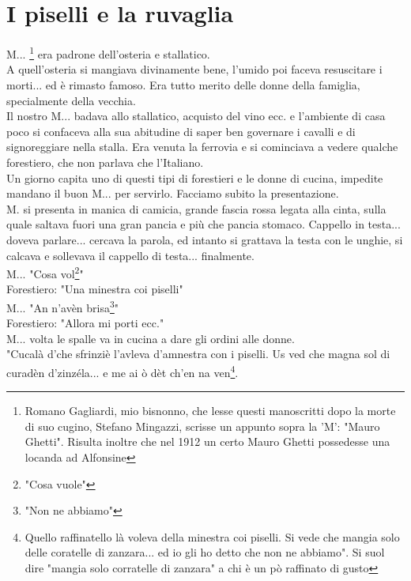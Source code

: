 
\chapter{I piselli e la ruvaglia}
M.\:.\:. \footnote{Romano Gagliardi, mio bisnonno, che lesse questi manoscritti dopo la morte di suo cugino, Stefano Mingazzi, scrisse un appunto sopra la 'M': "Mauro Ghetti". Risulta inoltre che nel 1912 un certo Mauro Ghetti possedesse una locanda ad Alfonsine} era padrone dell'osteria e stallatico.\\
A quell'osteria si mangiava divinamente bene, l'umido poi faceva resuscitare i morti... ed è rimasto famoso. Era tutto merito delle donne della famiglia, specialmente della vecchia.\\
Il nostro M.\:.\:. badava allo stallatico, acquisto del vino ecc. e l'ambiente di casa poco si confaceva alla sua abitudine di saper ben governare i cavalli e di signoreggiare nella stalla. Era venuta la ferrovia e si cominciava a vedere qualche forestiero, che non parlava che l'Italiano.\\
Un giorno capita uno di questi tipi di forestieri e le donne di cucina, impedite mandano il buon M.\:.\:. per servirlo. Facciamo subito la presentazione.\\
M. \:\: si presenta in manica di camicia, grande fascia rossa legata alla cinta, sulla quale saltava fuori una gran pancia e più che pancia stomaco. Cappello in testa... doveva parlare... cercava la parola, ed intanto si grattava la testa con le unghie, si calcava e sollevava il cappello di testa... finalmente. \\
M.\:.\:. "Cosa vol\footnote{"Cosa vuole"}"\\
Forestiero: "Una minestra coi piselli"\\
M.\:.\:. "An n'avèn brisa\footnote{"Non ne abbiamo"}"\\
Forestiero: "Allora mi porti ecc."\\
M.\:.\:. volta le spalle va in cucina a dare gli ordini alle donne. \\
"Cucalà d'che sfrinziè l'avleva d'amnestra con i piselli. Us ved che magna sol di curadèn d'zinzéla... e me ai ò dèt ch'en na ven\footnote{Quello raffinatello là voleva della minestra coi piselli. Si vede che mangia solo delle coratelle di zanzara... ed io gli ho detto che non ne abbiamo". Si suol dire "mangia solo corratelle di zanzara" a chi è un pò raffinato di gusto}. \\
